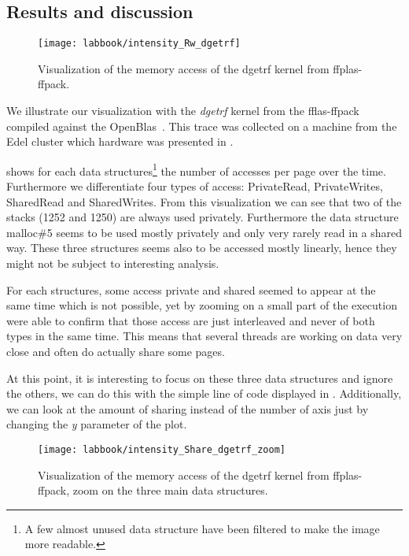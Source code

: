 \subsection{Results and discussion}

\begin{figure}[htb]
    \centering
    \texttt{[image: labbook/intensity\_Rw\_dgetrf]}
    \caption{Visualization of the memory access of the dgetrf kernel from ffplas-ffpack.}
    \label{fig:dgetrf-intensity}
\end{figure}

We illustrate our visualization with the \emph{dgetrf} kernel from the fflas-ffpack~\cite{group16FFLASFFPACK} compiled against the OpenBlas~\cite{Chothia16OpenBlas}.
This trace was collected on a machine from the Edel cluster which hardware was presented in .

 shows for each data structures\footnote{
    A few almost unused data structure have been filtered to make the image more readable.}
    the number of accesses per page over the time. Furthermore we differentiate four types of access: PrivateRead, PrivateWrites, SharedRead and SharedWrites.
From this visualization we can see that two of the stacks (1252 and 1250) are always used privately.
Furthermore the data structure malloc\#5 seems to be used mostly privately and only very rarely read in a shared way.
These three structures seems also to be accessed mostly linearly, hence they might not be subject to interesting analysis.

For each structures, some access private and shared seemed to appear at the same time which is not possible, yet by zooming on a small part of the execution were able to confirm that those access are just interleaved and never of both types in the same time.
This means that several threads are working on data very close and often do actually share some pages.



At this point, it is interesting to focus on these three data structures and ignore the others, we can do this with the simple line of code displayed in .
Additionally, we can look at the amount of sharing instead of the number of axis just by changing the \emph{y} parameter of the plot.

\begin{figure}[htb]
    \centering
    \texttt{[image: labbook/intensity\_Share\_dgetrf\_zoom]}
    \caption{Visualization of the memory access of the dgetrf kernel from ffplas-ffpack, zoom on the three main data structures.}
    \label{fig:dgetrf-share-zoom}
\end{figure}

